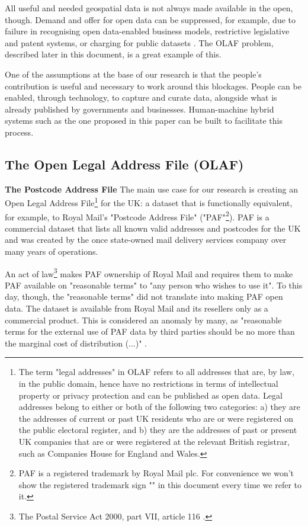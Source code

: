 All useful and needed geospatial data is not always made available in the open, though. Demand and offer for open data can be suppressed, for example, due to failure in recognising open data-enabled business models, restrictive legislative and patent systems, or charging for public datasets \cite{shadboltpaf}. The OLAF problem, described later in this document, is a great example of this.
	
One of the assumptions at the base of our research is that the people's contribution is useful and necessary to work around this blockages. People can be enabled, through technology, to capture and curate data, alongside what is already published by governments and businesses. Human-machine hybrid systems such as the one proposed in this paper can be built to facilitate this process.

\subsection{The Open Legal Address File (OLAF)}
\label{subs:the-problem-of-creating-an-olaf}

\textbf{The Postcode Address File} The main use case for our research is creating an Open Legal Address File\footnote{The term "legal addresses" in OLAF refers to all addresses that are, by law, in the public domain, hence have no restrictions in terms of intellectual property or privacy protection and can be published as open data. Legal addresses belong to either or both of the following two categories: a) they are the addresses of current or past UK residents who are or were registered on the public electoral register, and b) they are the addresses of past or present UK companies that are or were registered at the relevant British registrar, such as Companies House for England and Wales.} for the UK: a dataset that is functionally equivalent, for example, to Royal Mail's "Postcode Address File" ("PAF"\footnote{PAF is a registered trademark by Royal Mail plc. For convenience we won't show the registered trademark sign "\textregistered" in this document every time we refer to it.}). PAF is a commercial dataset that lists all known valid addresses and postcodes for the UK and was created by the once state-owned mail delivery services company over many years of operations.

An act of law\footnote{The Postal Service Act 2000, part VII, article 116 \cite{postalserviceact2000}.} makes PAF ownership of Royal Mail and requires them to make PAF available on "reasonable terms" to "any person who wishes to use it". To this day, though, the "reasonable terms" did not translate into making PAF open data. The dataset is available from Royal Mail and its resellers only as a commercial product. This is considered an anomaly by many, as "reasonable terms for the external use of PAF data by third parties should be no more than the marginal cost of distribution (...)" \cite{odugresponse}. 

